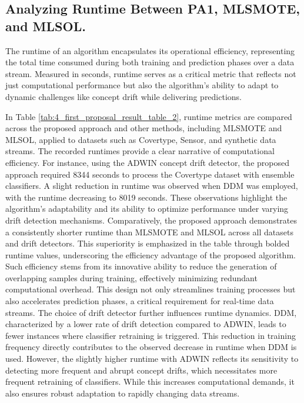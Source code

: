 \subsection{Analyzing Runtime Between PA1, MLSMOTE, and MLSOL.}

The runtime of an algorithm encapsulates its operational efficiency, representing the total time consumed during both training and prediction phases over a data stream. Measured in seconds, runtime serves as a critical metric that reflects not just computational performance but also the algorithm's ability to adapt to dynamic challenges like concept drift while delivering predictions.

In Table \ref{tab:4_first_proposal_result_table_2}, runtime metrics are compared across the proposed approach and other methods, including MLSMOTE and MLSOL, applied to datasets such as Covertype, Sensor, and synthetic data streams. The recorded runtimes provide a clear narrative of computational efficiency. For instance, using the ADWIN concept drift detector, the proposed approach required 8344 seconds to process the Covertype dataset with ensemble classifiers. A slight reduction in runtime was observed when DDM was employed, with the runtime decreasing to 8019 seconds. These observations highlight the algorithm’s adaptability and its ability to optimize performance under varying drift detection mechanisms. Comparatively, the proposed approach demonstrates a consistently shorter runtime than MLSMOTE and MLSOL across all datasets and drift detectors. This superiority is emphasized in the table through bolded runtime values, underscoring the efficiency advantage of the proposed algorithm. Such efficiency stems from its innovative ability to reduce the generation of overlapping samples during training, effectively minimizing redundant computational overhead. This design not only streamlines training processes but also accelerates prediction phases, a critical requirement for real-time data streams. The choice of drift detector further influences runtime dynamics. DDM, characterized by a lower rate of drift detection compared to ADWIN, leads to fewer instances where classifier retraining is triggered. This reduction in training frequency directly contributes to the observed decrease in runtime when DDM is used. However, the slightly higher runtime with ADWIN reflects its sensitivity to detecting more frequent and abrupt concept drifts, which necessitates more frequent retraining of classifiers. While this increases computational demands, it also ensures robust adaptation to rapidly changing data streams.

